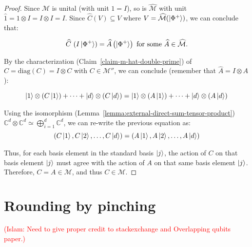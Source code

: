 \documentclass[12pt]{article}
\theoremstyle{plain}
\newcommand{\IslamNote}[1]{\textcolor{red}{(Islam: #1)}}
\newcommand{\IslamNote}[1]{}
\begin{document}
\begin{proof}
Since $\mathcal{M}$ is unital (with unit $1 = I$), so is $\widehat{\mathcal{M}}$ with unit $\widehat{1} = 1 \otimes I = I \otimes I = I$. Since $\widehat{C}(V) \subseteq V$ where $V = \widehat{\mathcal{M}}(\ket{\Phi^+})$, we can conclude that:

\[
    \widehat{C}\ (I \ket{\Phi^+}) = \widehat{A} \left(\ket{\Phi^+}\right) \text{ for some } \widehat{A} \in \widehat{\mathcal{M}}.
\]

\noindent By the characterization (Claim~\ref{claim-m-hat-double-prime}) of $\widehat{C} = \text{diag}(C) = I \otimes C$ with $C \in \mathcal{M}''$, we can conclude (remember that $\widehat{A} = I \otimes A$):

\begin{equation}
    \ket{1} \otimes (C\ket{1}) + \dots + \ket{d} \otimes (C\ket{d}) = \ket{1} \otimes (A\ket{1}) + \dots + \ket{d} \otimes (A\ket{d})
\end{equation}

\noindent Using the isomorphism (Lemma~\ref{lemma:external-direct-sum-tensor-product}) $\mathbb{C}^d \otimes \mathbb{C}^d \simeq \bigoplus_{i = 1}^d \mathbb{C}^d$, we can re-write the previous equation as:
\begin{equation}
    \left(C\ket{1}, C\ket{2}, \dots, C\ket{d}\right) = \left(A\ket{1}, A\ket{2}, \dots, A\ket{d}\right)
\end{equation}

Thus, for each basis element in the standard basis $\ket{j}$, the action of $C$ on that basis element $\ket{j}$ must agree with the action of $A$ on that same basis element $\ket{j}$. Therefore, $C = A \in \mathcal{M}$, and thus $C \in \mathcal{M}$.

\end{proof}


\newpage
\section{Rounding by pinching}

\IslamNote{Need to give proper credit to stackexchange and Overlapping qubits paper.}
\end{document}
